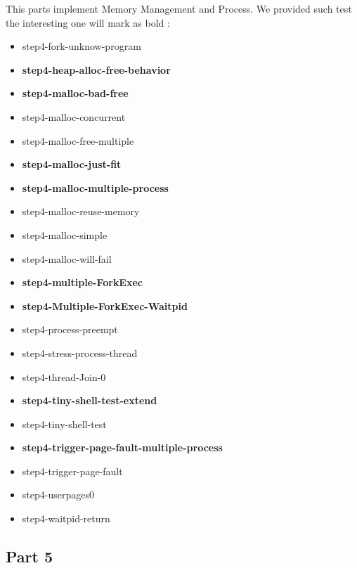 \documentclass[a4paper,10pt]{article}
\begin{document}
This parts implement Memory Management and Process. We provided such test the interesting one will mark as bold :
\begin{itemize}
\item step4-fork-unknow-program
\item {\bf step4-heap-alloc-free-behavior}
\item {\bf step4-malloc-bad-free}
\item step4-malloc-concurrent
\item step4-malloc-free-multiple
\item {\bf step4-malloc-just-fit}
\item {\bf step4-malloc-multiple-process}
\item step4-malloc-reuse-memory
\item step4-malloc-simple 
\item step4-malloc-will-fail
\item {\bf step4-multiple-ForkExec}
\item {\bf step4-Multiple-ForkExec-Waitpid} 
\item step4-process-preempt
\item step4-stress-process-thread
\item step4-thread-Join-0
\item {\bf step4-tiny-shell-test-extend}
\item step4-tiny-shell-test
\item {\bf step4-trigger-page-fault-multiple-process}
\item step4-trigger-page-fault
\item step4-userpages0
\item step4-waitpid-return
\end{itemize} 

\subsection{Part 5}
\end{document}
